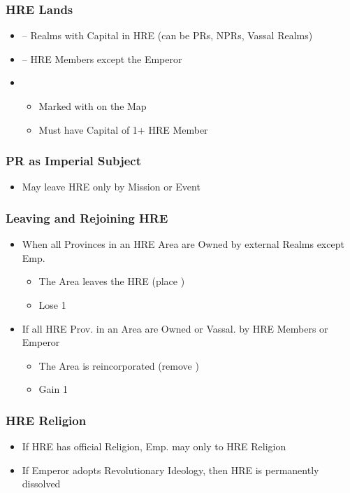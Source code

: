 \documentclass[10pt]{article}
\begin{document}
\subsubsection*{HRE Lands }
\begin{itemize}
	\item {} -- Realms with Capital in HRE (can be PRs, NPRs, Vassal Realms)
	\item {} -- HRE Members except the Emperor
	\item {}
	\begin{itemize}
		\item Marked with \authority on the Map
		\item Must have Capital of 1+ HRE Member
	\end{itemize}
\end{itemize}

\subsubsection*{PR as Imperial Subject }
\begin{itemize}
	\item May leave HRE only by Mission or Event
\end{itemize}

\subsubsection*{Leaving and Rejoining HRE }
\begin{itemize}
	\item When all Provinces in an HRE Area are Owned by external Realms except Emp.
	\begin{itemize}
		\item The Area leaves the HRE (place \nothre)
		\item Lose 1\authority
	\end{itemize}
	\item If all HRE Prov. in an Area are Owned or Vassal. by HRE Members or Emperor
	\begin{itemize}
		\item The Area is reincorporated (remove \nothre)
		\item Gain 1\authority
	\end{itemize}
\end{itemize}

\subsubsection*{HRE Religion }
\begin{itemize}
	\item If HRE has official Religion, Emp. may only  to HRE Religion 
	\item If Emperor adopts Revolutionary Ideology, then HRE is permanently dissolved
\end{itemize}
\end{document}
